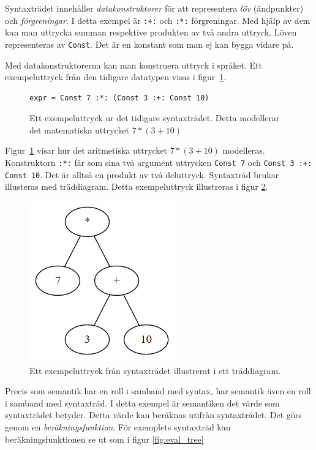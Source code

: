 \begin{draft}
Syntaxträdet innehåller \textit{datakonstruktorer} för att representera
\textit{löv} (ändpunkter) och \textit{förgreningar}. I detta exempel är
\texttt{:+:} och \texttt{:*:} förgreningar. Med hjälp av dem kan man uttrycka
summan respektive produkten av två andra uttryck. Löven representeras av
\texttt{Const}. Det är en konstant som man ej kan bygga vidare på.

Med datakonstruktorerna kan man konstruera uttryck i språket. Ett exempeluttryck
från den tidigare datatypen visas i figur~\ref{fig:syntax_exempel_varde}.

\begin{figure}[tph]
  \begin{lstlisting}
expr = Const 7 :*: (Const 3 :+: Const 10)
  \end{lstlisting}
  \caption{Ett exempeluttryck ur det tidigare syntaxträdet. Detta modellerar det
           matematiska uttrycket $7 * (3 + 10)$}\label{fig:syntax_exempel_varde}
\end{figure}

Figur~\ref{fig:syntax_exempel_varde} visar hur det aritmetiska uttrycket $7 * (3
+ 10)$ modelleras. Konstruktorn \texttt{:*:} får som sina två argument uttrycken
\texttt{Const 7} och \texttt{Const 3 :+: Const 10}. Det är alltså en produkt av
två deluttryck. Syntaxträd brukar illusteras med träddiagram. Detta
exempeluttryck illustreras i figur \ref{fig:syntax_exempel_bild}.

\begin{figure}[tph]
  \centering
  \includegraphics[width=0.4\linewidth]{figure/syntax_exempel_bild.png}
  \caption{Ett exempeluttryck från syntaxträdet illustrerat i ett
           träddiagram.}\label{fig:syntax_exempel_bild} 
\end{figure}

Precis som semantik har en roll i samband med syntax, har semantik även en roll
i samband med syntaxträd. I detta exempel är semantiken det värde som
syntaxträdet betyder. Detta värde kan beräknas utifrån syntaxträdet. Det görs
genom en \textit{beräkningsfunktion}. För exemplets syntaxträd kan
beräkningsfunktionen se ut som i figur \ref{fig:eval_tree}


\end{draft}
